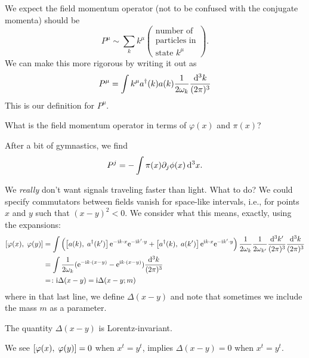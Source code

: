 We expect the field momentum operator (not to be confused with the
conjugate momenta) should be
\begin{equation*}
P^{\mu}\sim\sum_{k} k^{\mu}
  \begin{pmatrix}\mbox{number of}\\
    \mbox{particles in}\\
    \mbox{state $k^{\mu}$}
  \end{pmatrix}.
\end{equation*}
We can make this more rigorous by writing it out as
\begin{equation}
P^{\mu} = \int k^{\mu}a^{\dagger}(k)a(k)\frac{1}{2\omega_{k}}\frac{\mathrm{d}^{3}k}{(2\pi)^{3}}
\end{equation}
This is our definition for $P^{\mu}$.

 What is the field momentum operator in terms of $\varphi(x)$
and $\pi(x)$?

 After a bit of gymnastics, we find
\begin{equation}
  P^{j} = -\int\pi(x)\partial_{j}\phi(x)\,\mathrm{d}^{3}x.
\end{equation}

We \emph{really} don't want signals traveling faster than light. What to
do? We could specify commutators between fields vanish for space-like
intervals, i.e., for points $x$ and $y$ such that $(x-y)^{2}<0$. We
consider what this means, exactly, using the expansions:
\begin{subequations}
  \begin{align}
    \left\lbrack\varphi(x),\;\varphi(y)\right\rbrack
    &= \int\left(\left\lbrack a(k),\;a^{\dagger}(k')\right\rbrack\mathrm{e}^{-{\rm i} k\cdot
      x}\mathrm{e}^{-{\rm i} k'\cdot y} + \left\lbrack a^{\dagger}(k),\;a(k')\right\rbrack\mathrm{e}^{{\rm i}
      k\cdot x}\mathrm{e}^{-{\rm i} k'\cdot
      y}\right)\frac{1}{2\omega_{k}}\frac{1}{2\omega_{k'}}\frac{\mathrm{d}^{3}k'}{(2\pi)^{3}}\frac{\mathrm{d}^{3}k}{(2\pi)^{3}}\\
&=\int\frac{1}{2\omega_{k}}(\mathrm{e}^{-{\rm i} k\cdot(x-y)}-\mathrm{e}^{{\rm i} k\cdot(x-y)})\frac{\mathrm{d}^{3}k}{(2\pi)^{3}}\\
&=\colon {\rm i}\Delta(x-y) = {\rm i}\Delta(x-y; m)
  \end{align}
\end{subequations}
where in that last line, we define $\Delta(x-y)$ and note that sometimes
we include the mass $m$ as a parameter.

 The quantity $\Delta(x-y)$ is Lorentz-invariant.

We see $\left\lbrack\varphi(x),\;\varphi(y)\right\rbrack=0$ when $x^{t}=y^{t}$,
implies $\Delta(x-y)=0$ when $x^{t}=y^{t}$.

